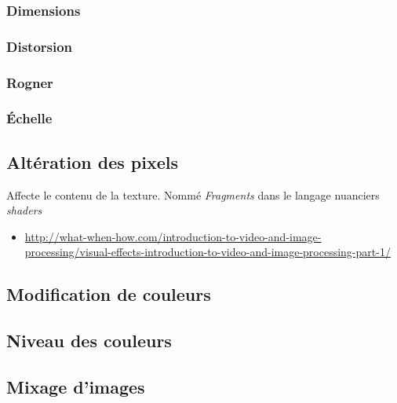 \documentclass[
  french,
]{book}
\providecommand{\tightlist}{%
  \setlength{\itemsep}{0pt}\setlength{\parskip}{0pt}}
\begin{document}
\hypertarget{dimensions}{%
\subsubsection{Dimensions}\label{dimensions}}

\hypertarget{distorsion}{%
\subsubsection{Distorsion}\label{distorsion}}

\hypertarget{rogner}{%
\subsubsection{Rogner}\label{rogner}}

\hypertarget{uxe9chelle}{%
\subsubsection{Échelle}\label{uxe9chelle}}

\hypertarget{altuxe9ration-des-pixels}{%
\subsection{Altération des pixels}\label{altuxe9ration-des-pixels}}

Affecte le contenu de la texture. Nommé \emph{Fragments} dans le langage nuanciers \emph{shaders}

\begin{itemize}
\tightlist
\item
  \url{http://what-when-how.com/introduction-to-video-and-image-processing/visual-effects-introduction-to-video-and-image-processing-part-1/}
\end{itemize}

\hypertarget{modification-de-couleurs}{%
\subsection{Modification de couleurs}\label{modification-de-couleurs}}

\hypertarget{niveau-des-couleurs}{%
\subsection{Niveau des couleurs}\label{niveau-des-couleurs}}

\hypertarget{mixage-dimages}{%
\subsection{Mixage d'images}\label{mixage-dimages}}
\end{document}
